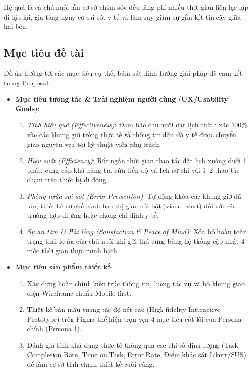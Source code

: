 Hệ quả là cả chủ nuôi lẫn cơ sở chăm sóc đều lãng phí nhiều thời gian liên lạc lặp đi lặp lại, gia tăng nguy cơ sai sót y tế và làm suy giảm sự gắn kết tin cậy giữa hai bên.

\subsection{Mục tiêu đề tài}
Đồ án hướng tới các mục tiêu cụ thể, bám sát định hướng giải pháp đã cam kết trong Proposal:
\begin{itemize}
    \item \textbf{Mục tiêu tương tác \& Trải nghiệm người dùng (UX/Usability Goals)}:
    \begin{enumerate}
        \item \textit{Tính hiệu quả (Effectiveness)}: Đảm bảo chủ nuôi đặt lịch chính xác 100\% vào các khung giờ trống thực tế và thông tin dặn dò y tế được chuyển giao nguyên vẹn tới kỹ thuật viên phụ trách.
        \item \textit{Hiệu suất (Efficiency)}: Rút ngắn thời gian thao tác đặt lịch xuống dưới 1 phút; cung cấp khả năng tra cứu tiến độ và lịch sử chỉ với 1--2 thao tác chạm trên thiết bị di động.
        \item \textit{Phòng ngừa sai sót (Error Prevention)}: Tự động khóa các khung giờ đã kín; thiết kế cơ chế cảnh báo thị giác nổi bật (visual alert) đối với các trường hợp dị ứng hoặc chống chỉ định y tế.
        \item \textit{Sự an tâm \& Hài lòng (Satisfaction \& Peace of Mind)}: Xóa bỏ hoàn toàn trạng thái lo âu của chủ nuôi khi gửi thú cưng bằng hệ thống cập nhật 4 mốc thời gian thực minh bạch.
    \end{enumerate}
    \item \textbf{Mục tiêu sản phẩm thiết kế}:
    \begin{enumerate}
        \item Xây dựng hoàn chỉnh kiến trúc thông tin, luồng tác vụ và bộ khung giao diện Wireframe chuẩn Mobile-first.
        \item Thiết kế bản mẫu tương tác độ nét cao (High-fidelity Interactive Prototype) trên Figma thể hiện trọn vẹn 4 mục tiêu cốt lõi của Persona chính (Persona 1).
        \item Đánh giá tính khả dụng thực tế thông qua các chỉ số định lượng (Task Completion Rate, Time on Task, Error Rate, Điểm khảo sát Likert/SUS) để làm cơ sở tinh chỉnh thiết kế cuối cùng.
    \end{enumerate}
\end{itemize}

